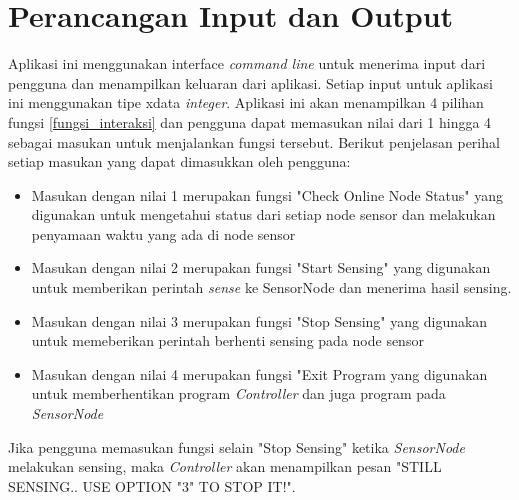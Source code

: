 \section{Perancangan Input dan Output}
Aplikasi ini menggunakan interface \textit{command line} untuk menerima input dari pengguna dan menampilkan keluaran dari aplikasi. Setiap input untuk aplikasi ini menggunakan tipe xdata \textit{integer}. Aplikasi ini akan menampilkan 4 pilihan fungsi \ref{fungsi_interaksi} dan pengguna dapat memasukan nilai dari 1 hingga 4 sebagai masukan untuk menjalankan fungsi tersebut. Berikut penjelasan perihal setiap masukan yang dapat dimasukkan oleh pengguna:
\begin{itemize}
    \item Masukan dengan nilai 1 merupakan fungsi "Check Online Node Status" yang digunakan untuk mengetahui status dari setiap node sensor dan melakukan penyamaan waktu yang ada di node sensor
    
    \item Masukan dengan nilai 2 merupakan fungsi "Start Sensing" yang digunakan untuk memberikan perintah \textit{sense} ke SensorNode dan menerima hasil sensing.
    
    \item Masukan dengan nilai 3 merupakan fungsi "Stop Sensing" yang digunakan untuk memeberikan perintah berhenti sensing pada node sensor
    
    \item Masukan dengan nilai 4 merupakan fungsi "Exit Program yang digunakan untuk memberhentikan program \textit{Controller} dan juga program pada \textit{SensorNode}
\end{itemize}

Jika pengguna memasukan fungsi selain "Stop Sensing" ketika \textit{SensorNode} melakukan sensing, maka \textit{Controller} akan menampilkan pesan "STILL SENSING.. USE OPTION "3" TO STOP IT!".

